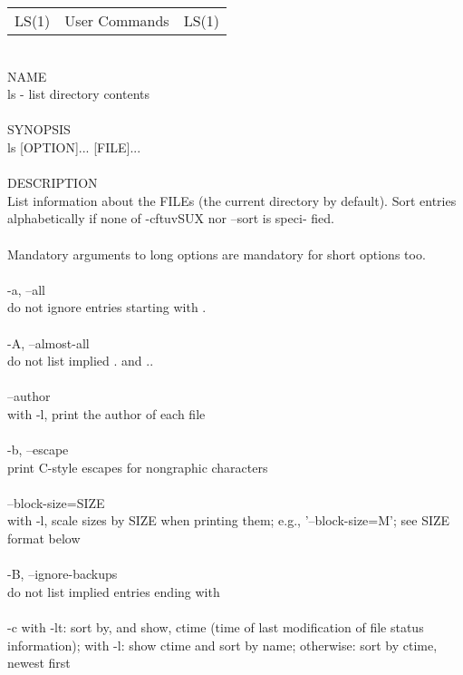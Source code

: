 \documentclass{article}
\begin{document}
\begin{tabular}{lcr}
LS(1) &  User Commands &  LS(1) \\
\end{tabular}
\\
NAME \\
       ls - list directory contents \\
\\
SYNOPSIS \\
       ls [OPTION]... [FILE]... \\
\\
DESCRIPTION \\
       List  information  about  the FILEs (the current directory by default).
       Sort entries alphabetically if none of -cftuvSUX nor --sort  is  speci‐
       fied. \\
\\
       Mandatory  arguments  to  long  options are mandatory for short options
       too. \\
\\
       -a, --all\\
              do not ignore entries starting with .\\
\\
       -A, --almost-all\\
              do not list implied . and .. \\
\\
       --author \\
              with -l, print the author of each file \\
\\
       -b, --escape \\
              print C-style escapes for nongraphic characters \\
\\
       --block-size=SIZE \\
              with  -l,  scale  sizes  by  SIZE  when  printing  them;   e.g.,
              '--block-size=M'; see SIZE format below \\
\\
       -B, --ignore-backups \\
              do not list implied entries ending with ~ \\
\\
       -c     with -lt: sort by, and show, ctime (time of last modification of
              file status information); with -l: show ctime and sort by  name;
              otherwise: sort by ctime, newest first \\
\end{document}
